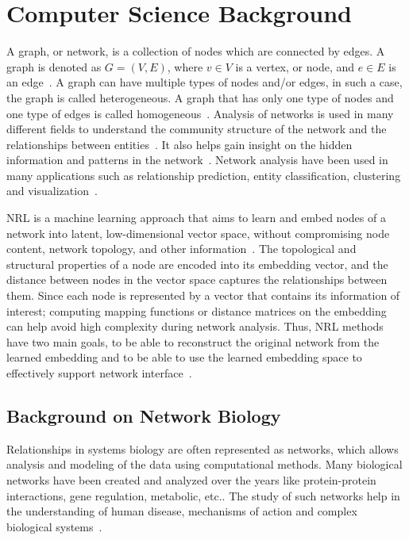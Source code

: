 \chapter{Computer Science Background}
\label{ch:computerscience}

A graph, or network, is a collection of nodes which are connected by edges.
A graph is denoted as $G=(V,E)$, where $v \in V$ is a vertex, or node, and $e \in E$ is an edge~\cite{cai_comprehensive_2017}.
A graph can have multiple types of nodes and/or edges, in such a case, the graph is called heterogeneous.
A graph that has only one type of nodes and one type of edges is called homogeneous~\cite{cai_comprehensive_2017}.
Analysis of networks is used in many different fields to understand the community structure of the network and the relationships between entities~\cite{cai_comprehensive_2017}.
It also helps gain insight on the hidden information and patterns in the network~\cite{cai_comprehensive_2017}.
Network analysis have been used in many applications such as relationship prediction, entity classification, clustering and visualization~\cite{goyal_graph_2018}.

\ac{NRL} is a machine learning approach that aims to learn and embed nodes of a network into latent, low-dimensional vector space, without compromising node content, network topology, and other information~\cite{zhang_network_2017}.
The topological and structural properties of a node are encoded into its embedding vector, and the distance between nodes in the vector space captures the relationships between them.
Since each node is represented by a vector that contains its information of interest; computing mapping functions or distance matrices on the embedding can help avoid high complexity during network analysis.
Thus, \ac{NRL} methods have two main goals, to be able to reconstruct the original network from the learned embedding and to be able to use the learned embedding space to effectively support network interface~\cite{sheikh_gat2vec:_2018}.

\section{Background on Network Biology}

Relationships in systems biology are often represented as networks, which allows analysis and modeling of the data using computational methods.
Many biological networks have been created and analyzed over the years like protein-protein interactions, gene regulation, metabolic, etc..
The study of such networks help in the understanding of human disease, mechanisms of action and complex biological systems~\cite{dancik_properties_2013}.

